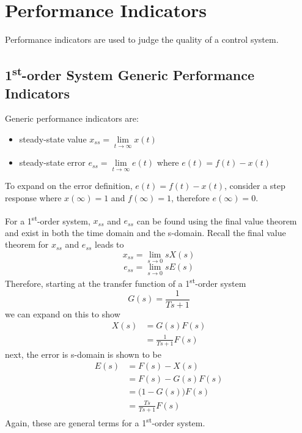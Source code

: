 \documentclass[12pt,letter]{article}
\begin{document}
%	
%	

	\setcounter{section}{4}	


\section{Performance Indicators}

Performance indicators are used to judge the quality of a control system. 

\subsection{1\textsuperscript{st}-order System Generic Performance Indicators}


Generic performance indicators are:
\begin{itemize}
	\item steady-state value $x_{ss} = \lim\limits_{t \rightarrow \infty} x(t)$
	\item steady-state error $e_{ss} = \lim\limits_{t \rightarrow \infty} e(t)$ where  $e(t) = f(t) - x(t)$
\end{itemize}
To expand on the error definition, $e(t) = f(t) - x(t)$, consider a step response where $x(\infty) =1$ and $f(\infty) =1$, therefore $e(\infty)=0$. 

For a 1\textsuperscript{st}-order system, $x_{ss}$ and $e_{ss}$ can be found using the final value theorem and exist in both the time domain and the s-domain. Recall the final value theorem for  $x_{ss}$ and $e_{ss}$ leads to
\begin{equation}
x_{ss} = \lim\limits_{s \rightarrow 0} s X(s)
\end{equation}
\begin{equation}
e_{ss} = \lim\limits_{s \rightarrow 0} s E(s)
\end{equation}
Therefore, starting at the transfer function of a 1\textsuperscript{st}-order system
\begin{equation}
G(s) = \frac{1}{Ts+1}
\end{equation}
we can expand on this to show
\begin{align}
X(s) &= G(s)F(s) \\
&= \frac{1}{Ts +1}F(s) \nonumber
\end{align}
next, the error is s-domain is shown to be
\begin{align}
E(s) &= F(s) - X(s) \\
&= F(s) - G(s)F(s) \\ \nonumber
&= \big( 1-G(s) \big) F(s) \\ \nonumber
&= \frac{Ts}{Ts +1} F(s) \nonumber
\end{align}
Again, these are general terms for a 1\textsuperscript{st}-order system. 
\end{document}
